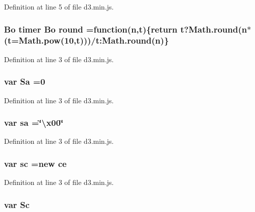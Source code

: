 Definition at line 5 of file d3.\+min.\+js.

\subsubsection[{round}]{ {\bf Bo} {\bf timer} {\bf Bo} round =function({\bf n},t)\{{\bf return} t?Math.\+round({\bf n}$\ast$(t={\bf Math.\+pow}(10,t)))/t\+:\+Math.\+round({\bf n})\}}\label{d3_8min_8js_a464c83fe4045640a67d2e5e006348309}


Definition at line 3 of file d3.\+min.\+js.

\subsubsection[{Sa}]{\setlength{\rightskip}{0pt plus 5cm}var Sa =0}\label{d3_8min_8js_a1cc3e62a66ab3d24f4ac823d4ea3f829}


Definition at line 3 of file d3.\+min.\+js.

\subsubsection[{sa}]{\setlength{\rightskip}{0pt plus 5cm}var sa =\char`\"{}\textbackslash{}x00\char`\"{}}\label{d3_8min_8js_a588a99c3f9915b94905f6af3e99e735f}


Definition at line 3 of file d3.\+min.\+js.

\subsubsection[{sc}]{\setlength{\rightskip}{0pt plus 5cm}var sc =new ce}\label{d3_8min_8js_aa2bbb77106c497f7066e9415602deedf}


Definition at line 3 of file d3.\+min.\+js.

\subsubsection[{Sc}]{\setlength{\rightskip}{0pt plus 5cm}var Sc}\label{d3_8min_8js_a991a73f77591b3f9ed0566f8071b0cc2}


